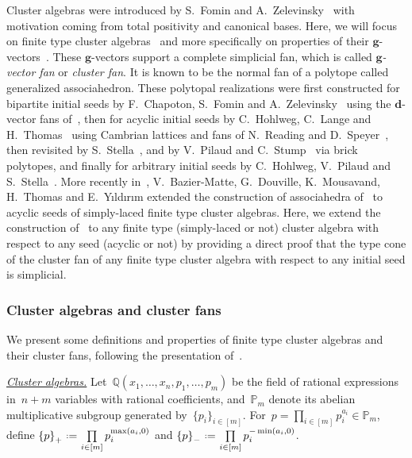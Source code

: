 \documentclass{amsart}
\theoremstyle{definition}
\newcommand{\Q}{\mathbb{Q}} %
\renewcommand{\b}[1]{{\boldsymbol{#1}}} %
\newcommand{\eqdef}{\mbox{\,\raisebox{0.2ex}{\scriptsize\ensuremath{\mathrm:}}\ensuremath{=}\,}} %
\newcommand{\darkblue}{\color{darkblue}} %
\newcommand{\defn}[1]{\textsl{\darkblue #1}} %
\newcommand{\para}[1]{\medskip\noindent\uline{\textit{#1.}}} %
\newcommand{\Trop}[1]{\mathbb{P}_{#1}} %
\newcommand{\positiveExponents}[1]{\left\{#1\right\}_+} %
\newcommand{\negativeExponents}[1]{\left\{#1\right\}_-} %
\begin{document}
Cluster algebras were introduced by S.~Fomin and A.~Zelevinsky~\cite{FominZelevinsky-ClusterAlgebrasI} with motivation coming from total positivity and canonical bases.
Here, we will focus on finite type cluster algebras~\cite{FominZelevinsky-ClusterAlgebrasII} and more specifically on properties of their $\b{g}$-vectors~\cite{FominZelevinsky-ClusterAlgebrasIV}.
These $\b{g}$-vectors support a complete simplicial fan, which is called \defn{$\b{g}$-vector fan} or \defn{cluster fan}. It is known to be the normal fan of a polytope called generalized associahedron. These polytopal realizations were first constructed for bipartite initial seeds by F.~Chapoton, S.~Fomin and A.~Zelevinsky~\cite{ChapotonFominZelevinsky} using the $\b{d}$-vector fans of~\cite{FominZelevinsky-YSystems}, then for acyclic initial seeds by C.~Hohlweg, C.~Lange and H.~Thomas~\cite{HohlwegLangeThomas} using Cambrian lattices and fans of N.~Reading and D.~Speyer~\cite{Reading-CambrianLattices, ReadingSpeyer}, then revisited by S.~Stella~\cite{Stella}, and by V.~Pilaud and C.~Stump~\cite{PilaudStump-brickPolytope} via brick polytopes, and finally for arbitrary initial seeds by C.~Hohlweg, V.~Pilaud and S.~Stella~\cite{HohlwegPilaudStella}.
More recently in~\cite{BazierMatteDouvilleMousavandThomasYildirim}, V.~Bazier-Matte, G.~Douville, K.~Mousavand, H.~Thomas and E.~Y\i ld\i r\i m extended the construction of associahedra of~\cite[Sect.~3.2]{ArkaniHamedBaiHeYan} to acyclic seeds of simply-laced finite type cluster algebras.
Here, we extend the construction of~\cite[Sect.~3.2]{ArkaniHamedBaiHeYan} to any finite type (simply-laced or not) cluster algebra with respect to any seed (acyclic or not) by providing a direct proof that the type cone of the cluster fan of any finite type cluster algebra with respect to any initial seed is simplicial.


\subsubsection{Cluster algebras and cluster fans}

We present some definitions and properties of finite type cluster algebras and their cluster fans, following the presentation of~\cite{HohlwegPilaudStella}.

\para{Cluster algebras}
%
Let~$\Q(x_1, \dots, x_n, p_1, \dots, p_m)$ be the field of rational expressions in~$n+m$ variables with rational coefficients, and~$\Trop{m}$ denote its abelian multiplicative subgroup generated by~$\{p_i\}_{i \in [m]}$.
For~$p = \prod\limits_{i \in [m]} p_i^{a_i} \in \Trop{m}$, define
\(
\positiveExponents{p} \eqdef \prod\limits_{i \in [m]} p_i^{\max(a_i,0)}
\)
and
\(
\negativeExponents{p} \eqdef \prod\limits_{i \in [m]} p_i^{-\min(a_i,0)}
\).
\end{document}
